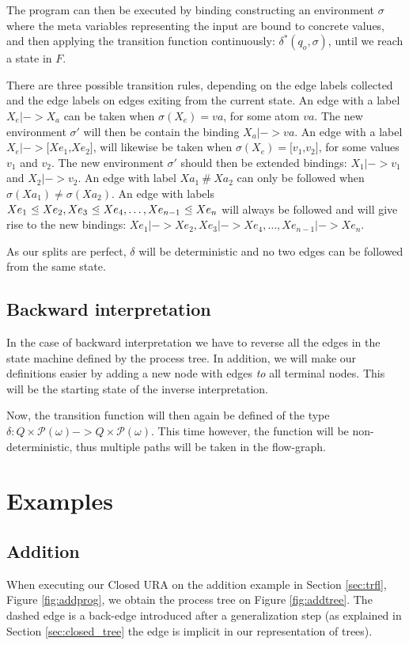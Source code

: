 \documentclass[10pt]{../sigplanconf}
\newcommand{\gen}{\ensuremath{~{\leq\kern-6pt \raisebox{1pt}{$\cdot$}}~}}
\begin{document}
The program can then be executed by binding constructing an
environment $\sigma$ where the meta variables representing the input
are bound to concrete values, and then applying the transition
function continuously: $\delta^{*}(q_o, \sigma)$, until we reach a
state in $F$. 

There are three possible transition rules, depending on the edge
labels collected and the edge labels on edges exiting from the current
state. An edge with a label $X_e |-> X_a$ can be taken when
$\sigma(X_e) = va$, for some atom $va$. The new environment $\sigma'$
will then be contain the binding $X_a |-> va$. An edge with a label
$X_e |-> \texttt{[}Xe_1\texttt{,}Xe_2\texttt{]}$, will likewise be
taken when $\sigma(X_e) = \texttt{[}v_1\texttt{,}v_2\texttt{]}$, for
some values $v_1$ and $v_2$. The new environment $\sigma'$ should then
be extended bindings: $X_1 |-> v_1$ and $X_2 |-> v_2$. An edge with
label $Xa_1\ \#\ Xa_2$ can only be followed when $\sigma(Xa_1) \neq
\sigma(Xa_2)$. An edge with labels $Xe_1 \gen Xe_2, Xe_3 \gen Xe_4,
\ldots, Xe_{n-1} \gen Xe_n$ will always be followed and will give rise
to the new bindings: $Xe_1 |-> Xe_2, Xe_3 |-> Xe_4, \ldots, Xe_{n-1}
|-> Xe_n$.

As our splits are perfect, $\delta$ will be deterministic and no two
edges can be followed from the same state.

\subsection{Backward interpretation}
In the case of backward interpretation we have to reverse all the
edges in the state machine defined by the process tree. In addition,
we will make our definitions easier by adding a new node with edges
\textit{to} all terminal nodes. This will be the starting state of the
inverse interpretation.

Now, the transition function will then again be defined of the type
$\delta : Q \times \mathcal{P}(\omega) -> Q \times
\mathcal{P}(\omega)$. This time however, the function will be
non-deterministic, thus multiple paths will be taken in the
flow-graph.

\section{Examples}
\subsection{Addition}
When executing our Closed URA on the addition example in Section
\ref{sec:trfl}, Figure \ref{fig:addprog}, we obtain the process tree
on Figure \ref{fig:addtree}. The dashed edge is a back-edge introduced
after a generalization step (as explained in Section
\ref{sec:closed_tree} the edge is implicit in our representation
of trees).
\end{document}

